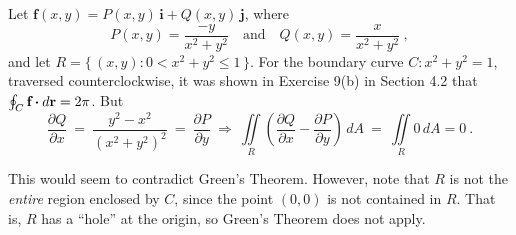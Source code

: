 \begin{exmp}\label{exmp:greenhole}
 Let $\textbf{f}(x,y) = P(x,y)\,\textbf{i} + Q(x,y)\,\textbf{j}$, where
 \begin{displaymath}
  P(x,y) = \frac{-y}{x^2 + y^2} \quad\text{and}\quad Q(x,y) = \frac{x}{x^2 + y^2} ~,
 \end{displaymath}
 and let $R =\lbrace\,(x,y): 0 < x^2 + y^2 \le 1\,\rbrace$. For the boundary curve $C:x^2 + y^2 = 1$, traversed
 counterclockwise, it was shown in Exercise 9(b) in Section 4.2 that $\oint_{C} \textbf{f} \bm{\cdot} d\textbf{r} = 2\pi$. But
 \begin{displaymath}
  \frac{\partial Q}{\partial x} ~=~ \frac{y^2 - x^2}{(x^2 + y^2 )^2} ~=~ \frac{\partial P}{\partial y} ~
  \Rightarrow ~
  \iint\limits_{R} \left( \frac{\partial Q}{\partial x} - \frac{\partial P}{\partial y} \right)\,dA ~=~
  \iint\limits_{R} 0 \,dA = 0~.
 \end{displaymath}
\end{exmp}
This would seem to contradict Green's Theorem. However, note that $R$ is not the \emph{entire} region enclosed by $C$,
since the point $(0,0)$ is not contained in $R$. That is, $R$ has a ``hole'' at the origin, so Green's Theorem does not
apply.

